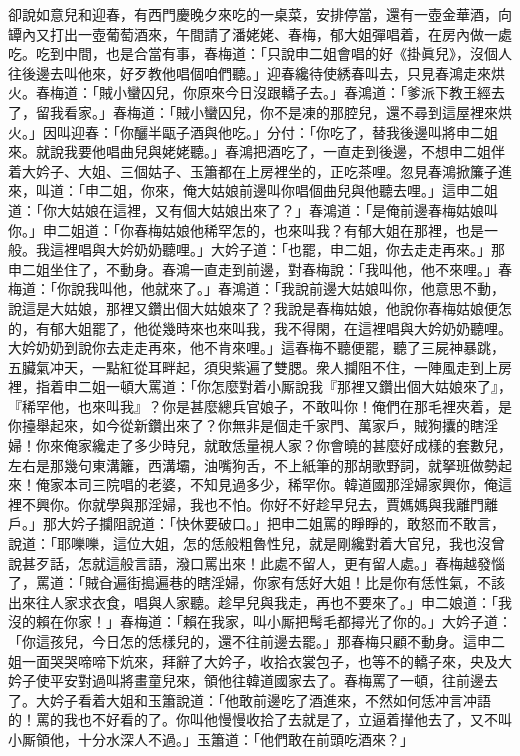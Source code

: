 卻說如意兒和迎春，有西門慶晚夕來吃的一桌菜，安排停當，還有一壺金華酒，{}向罈內又打出一壺葡萄酒來，午間請了潘姥姥、春梅，郁大姐彈唱着，在房內做一處吃。吃到中間，也是合當有事，春梅道：「只說申二姐會唱的好《掛眞兒》，沒個人往後邊去叫他來，好歹教他唱個咱們聽。」迎春纔待使綉春叫去，只見春鴻走來烘火。春梅道：「賊小蠻囚兒，你原來今日沒跟轎子去。」春鴻道：「爹派下教王經去了，留我看家。」春梅道：「賊小蠻囚兒，你不是凍的那腔兒，還不尋到這屋裡來烘火。」因叫迎春：「你釃半甌子酒與他吃。」分付：「你吃了，替我後邊叫將申二姐來。就說我要他唱曲兒與姥姥聽。」春鴻把酒吃了，一直走到後邊，不想申二姐伴着大妗子、大姐、三個姑子、玉簫都在上房裡坐的，正吃茶哩。忽見春鴻掀簾子進來，叫道：「申二姐，你來，俺大姑娘前邊叫你唱個曲兒與他聽去哩。」這申二姐道：「你大姑娘在這裡，又有個大姑娘出來了？」春鴻道：「是俺前邊春梅姑娘叫你。」申二姐道：「你春梅姑娘他稀罕怎的，也來叫我？有郁大姐在那裡，也是一般。我這裡唱與大妗奶奶聽哩。」大妗子道：「也罷，申二姐，你去走走再來。」那申二姐坐住了，不動身。{}春鴻一直走到前邊，對春梅說：「我叫他，他不來哩。」春梅道：「你說我叫他，他就來了。」春鴻道：「我說前邊大姑娘叫你，他意思不動，說這是大姑娘，那裡又鑽出個大姑娘來了？我說是春梅姑娘，他說你春梅姑娘便怎的，有郁大姐罷了，他從幾時來也來叫我，我不得閑，在這裡唱與大妗奶奶聽哩。大妗奶奶到說你去走走再來，他不肯來哩。」這春梅不聽便罷，聽了三屍神暴跳，五臟氣冲天，一點紅從耳畔起，須臾紫遍了雙腮。衆人攔阻不住，一陣風走到上房裡，指着申二姐一頓大罵道：「你怎麼對着小厮說我『那裡又鑽出個大姑娘來了』，『稀罕他，也來叫我』？你是甚麼總兵官娘子，不敢叫你！俺們在那毛裡夾着，是你擡舉起來，如今從新鑽出來了？你無非是個走千家門、萬家戶，賊狗攮的瞎淫婦！你來俺家纔走了多少時兒，就敢恁量視人家？你會曉的甚麼好成樣的套數兒，左右是那幾句東溝籬，西溝壩，油嘴狗舌，不上紙筆的那胡歌野詞，就拏班做勢起來！俺家本司三院唱的老婆，不知見過多少，稀罕你。韓道國那淫婦家興你，俺這裡不興你。{}你就學與那淫婦，我也不怕。你好不好趁早兒去，賈媽媽與我離門離戶。」那大妗子攔阻說道：「快休要破口。」把申二姐罵的睜睜的，敢怒而不敢言，說道：「耶嚛嚛，這位大姐，怎的恁般粗魯性兒，就是剛纔對着大官兒，我也沒曾說甚歹話，怎就這般言語，潑口罵出來！此處不留人，更有留人處。」春梅越發惱了，罵道：「賊㒲遍街搗遍巷的瞎淫婦，你家有恁好大姐！比是你有恁性氣，不該出來往人家求衣食，唱與人家聽。趁早兒與我走，再也不要來了。」申二娘道：「我沒的賴在你家！」春梅道：「賴在我家，叫小厮把髩毛都撏光了你的。」{}大妗子道：「你這孩兒，今日怎的恁樣兒的，還不往前邊去罷。」那春梅只顧不動身。這申二姐一面哭哭啼啼下炕來，拜辭了大妗子，收拾衣裳包子，也等不的轎子來，央及大妗子使平安對過叫將畫童兒來，領他往韓道國家去了。春梅罵了一頓，往前邊去了。大妗子看着大姐和玉簫說道：「他敢前邊吃了酒進來，不然如何恁冲言冲語的！罵的我也不好看的了。你叫他慢慢收拾了去就是了，立逼着攆他去了，又不叫小厮領他，十分水深人不過。」玉簫道：「他們敢在前頭吃酒來？」

